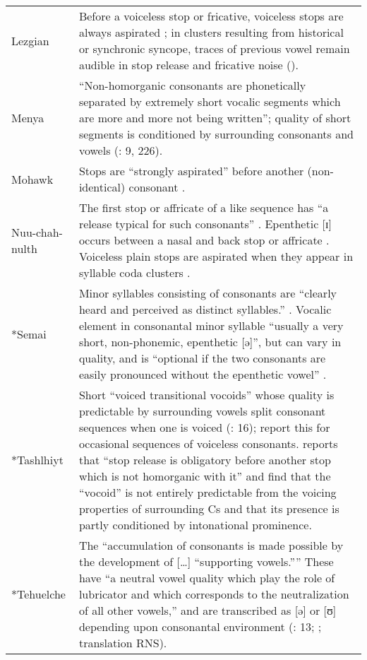 \begin{longtable}{p{55pt}p{278.6pt}}
{Lezgian} & Before a voiceless stop or fricative, voiceless stops are always aspirated \citep[47]{Haspelmath1993}; in clusters resulting from historical or synchronic syncope, traces of previous vowel remain audible in stop release and fricative noise (\citealt{ChitoranBabaliyeva2007}).\\
{Menya} & “Non-homorganic consonants are phonetically separated by extremely short vocalic segments which are more and more not being written”; quality of short segments is conditioned by surrounding consonants and vowels (\citealt{Whitehead2004}: 9, 226).\\
{Mohawk} & Stops are “strongly aspirated” before another (non-identical) consonant \citep[28]{Bonvillain1973}.\\
{Nuu-chah-nulth} & The first stop or affricate of a like sequence has “a release typical for such consonants” \citep[163--164]{Kim2003}. Epenthetic [ɪ] occurs between a nasal and back stop or affricate \citep[26--27]{Rose1981}. Voiceless plain stops are aspirated when they appear in syllable coda clusters \citep[12]{Davidson2002}.\\
{*Semai} & Minor syllables consisting of consonants are “clearly heard and perceived as distinct syllables.” \citep[321]{Sloan1988}. Vocalic element in consonantal minor syllable “usually a very short, non-phonemic, epenthetic [ə]”, but can vary in quality, and is “optional if the two consonants are easily pronounced without the epenthetic vowel” \citep[2]{Philips2007}.\\
{*Tashlhiyt} & Short “voiced transitional vocoids” whose quality is predictable by surrounding vowels split consonant sequences when one is voiced (\citealt{DellElmedlaoui2002}: 16); \citet[16]{GordonNafi2012} report this for occasional sequences of voiceless consonants. \citet[210]{Ridouane2008} reports that “stop release is obligatory before another stop which is not homorganic with it” and \citet{GriceEtAl2015} find that the “vocoid” is not entirely predictable from the voicing properties of surrounding Cs and that its presence is partly conditioned by intonational prominence.\\
{*Tehuelche} & The “accumulation of consonants is made possible by the development of […] ``supporting vowels.{''}” These have “a neutral vowel quality which play the role of lubricator and which corresponds to the neutralization of all other vowels,” and are transcribed as [ə] or [ʊ] depending upon consonantal environment (\citealt{FernándezGarayHernández2006}: 13;  \citealt{FernándezGaray1998}; translation RNS).\\

\end{longtable}
